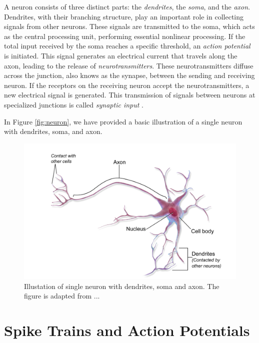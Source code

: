 \documentclass[a4paper, UKenglish, 11pt]{uiomaster}
\begin{document}
A neuron consists of three distinct parts: the \emph{dendrites}, the \emph{soma}, and the \emph{axon}. Dendrites, with their branching structure, play an important role in collecting signals from other neurons. These signals are transmitted to the soma, which acts as the central processing unit, performing essential nonlinear processing. If the total input received by the soma reaches a specific threshold, an \emph{action potential} is initiated. This signal generates an electrical current that travels along the axon, leading to the release of \emph{neurotransmitters}. These neurotransmitters diffuse across the junction, also knows as the synapse, between the sending and receiving neuron. If the receptors on the receiving neuron accept the neurotransmitters, a new electrical signal is generated. This transmission of signals between neurons at specialized junctions is called \emph{synaptic input} \cite{gerstner2014neuronal}.

In Figure \ref{fig:neuron}, we have provided a basic illustration of a single neuron with dendrites, soma, and axon.

\begin{figure}
    \centering
    \includegraphics[width=1.0\linewidth]{figures/neuron.pdf}
    \caption{Illustation of single neuron with dendrites, soma and axon. The figure is adapted from ... }
    \label{fig:action_potential}
\end{figure}


\section{Spike Trains and Action Potentials}
\end{document}
